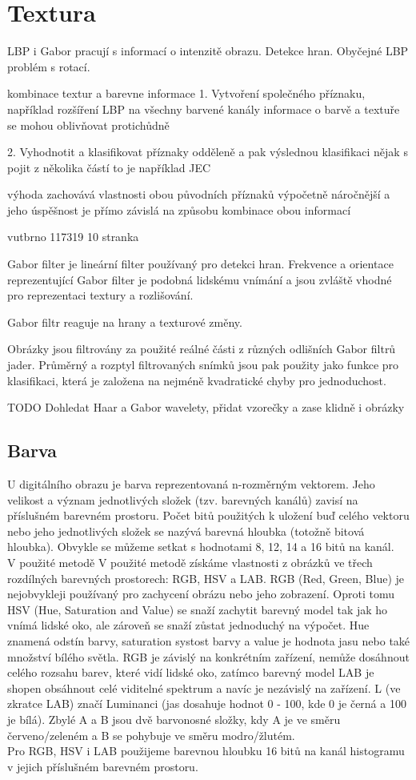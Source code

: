 \documentclass{report}
\begin{document}
\section{Textura}
LBP i Gabor pracují s informací o intenzitě obrazu. Detekce hran. Obyčejné LBP problém s rotací.

kombinace textur a barevne informace
1. Vytvoření společného příznaku, 
například rozšíření LBP na všechny barvené kanály
informace o barvě a textuře se mohou oblivňovat protichůdně

2. Vyhodnotit a klasifikovat příznaky odděleně a pak výslednou klasifikaci nějak s pojit z několika částí 
	to je například JEC
	
	výhoda zachovává vlastnosti obou původních příznaků 
	výpočetně náročnější a jeho úspěšnost je přímo závislá na způsobu kombinace obou informací	
	
vutbrno 117319 10 stranka

Gabor filter je lineární filter používaný pro detekci hran. Frekvence a orientace reprezentující Gabor filter je podobná lidskému vnímání a jsou zvláště vhodné pro reprezentaci textury a rozlišování. 

Gabor filtr reaguje na hrany a texturové změny. 

Obrázky jsou filtrovány za použité reálné části z různých odlišních Gabor filtrů jader. Průměrný a rozptyl filtrovaných snímků jsou pak použity jako funkce pro klasifikaci, která je založena na nejméně kvadratické chyby pro jednoduchost.

TODO Dohledat Haar a Gabor wavelety, přidat vzorečky a zase klidně i obrázky

\subsection{Barva}
U digitálního obrazu je barva reprezentovaná n-rozměrným vektorem. Jeho velikost a význam jednotlivých složek (tzv. barevných kanálů) zavisí na příslušném barevném prostoru. Počet bitů použitých k uložení buď celého vektoru nebo jeho jednotlivých složek se nazývá barevná hloubka (totožně bitová hloubka). Obvykle se můžeme setkat s hodnotami 8, 12, 14 a 16 bitů na kanál.
\\
V použité metodě V použité metodě získáme vlastnosti z obrázků ve třech rozdílných barevných prostorech: RGB, HSV a LAB. RGB (Red, Green, Blue) je nejobvykleji používaný pro zachycení obrázu nebo jeho zobrazení. Oproti tomu HSV (Hue, Saturation and Value) se snaží zachytit barevný model tak jak ho vnímá lidské oko, ale zároveň se snaží zůstat jednoduchý na výpočet. Hue znamená odstín barvy, saturation systost barvy a value je hodnota jasu nebo také množství bílého světla. RGB je závislý na konkrétním zařízení, nemůže dosáhnout celého rozsahu barev, které vidí lidské oko, zatímco barevný model LAB je shopen obsáhnout celé viditelné spektrum a navíc je nezávislý na zařízení. L (ve zkratce LAB) značí Luminanci (jas dosahuje hodnot 0 - 100, kde 0 je černá a 100 je bílá). Zbylé A a B jsou dvě barvonosné složky, kdy A je ve směru červeno/zeleném a B se pohybuje ve směru modro/žlutém. 
\\
Pro RGB, HSV i LAB použijeme barevnou hloubku 16 bitů na kanál histogramu v jejich příslušném barevném prostoru. 
\end{document}
